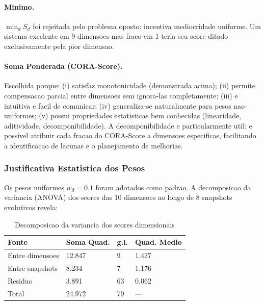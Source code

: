 \paragraph{Minimo.}

$\min_d S_d$ foi rejeitada pelo problema oposto: incentiva mediocridade
uniforme. Um sistema excelente em 9 dimensoes mas fraco em 1 teria seu
score ditado exclusivamente pela pior dimensao.

\paragraph{Soma Ponderada (CORA-Score).}

Escolhida porque: (i) satisfaz monotonicidade (demonstrada acima); (ii)
permite compensacao parcial entre dimensoes sem ignora-las completamente;
(iii) e intuitiva e facil de comunicar; (iv) generaliza-se naturalmente
para pesos nao-uniformes; (v) possui propriedades estatisticas bem
conhecidas (linearidade, aditividade, decomponibilidade). A
decomponibilidade e particularmente util: e possivel atribuir cada fracao
do CORA-Score a dimensoes especificas, facilitando a identificacao de
lacunas e o planejamento de melhorias.

\subsubsection{Justificativa Estatistica dos Pesos}

Os pesos uniformes $w_d = 0.1$ foram adotados como padrao. A decomposicao
da variancia (ANOVA) dos scores das 10 dimensoes ao longo de 8 snapshots
evolutivos revela:

\begin{table}[H]\centering\footnotesize
\caption{Decomposicao da variancia dos scores dimensionais}
\label{tab:anova-scores}
\begin{tabular}{p{}p{}p{}p{}}
\toprule
\textbf{Fonte} & \textbf{Soma Quad.} & \textbf{g.l.} & \textbf{Quad. Medio} \\
\midrule
Entre dimensoes & 12.847 & 9 & 1.427 \\
Entre snapshots & 8.234 & 7 & 1.176 \\
Residuo & 3.891 & 63 & 0.062 \\
\midrule
Total & 24.972 & 79 & --- \\
\bottomrule
\end{tabular}
\end{table}

